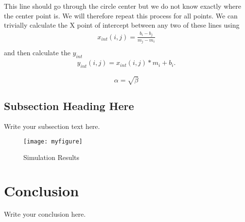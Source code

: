 \documentclass{article}
\begin{document}
This line should go through the circle center but we do not know exactly where the center point is.
We will therefore repeat this process for all points.
We can trivially calculate the X point of intercept between any two of these lines using 
\begin{align*}
x_{int}(i,j) = \frac{b_i-b_j}{m_j-m_i}\\
\end{align*}
and then calculate the $y_{int}$
\begin{align*}
y_{int}(i,j) = x_{int}(i,j)*m_i + b_i.
\end{align*}





\begin{equation}
    \label{simple_equation}
    \alpha = \sqrt{ \beta }
\end{equation}

\subsection{Subsection Heading Here}
Write your subsection text here.

\begin{figure}
    \centering
    \texttt{[image: myfigure]}
    \caption{Simulation Results}
    \label{simulationfigure}
\end{figure}

\section{Conclusion}
Write your conclusion here.
\end{document}
